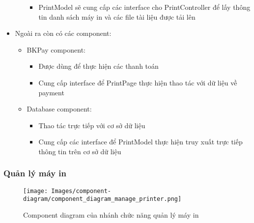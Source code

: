 \begin{itemize}
\begin{itemize}
\begin{itemize}
            \item PrintModel sẽ cung cấp các interface cho PrintController để lấy thông tin danh sách máy in và các file tài liệu được tải lên
        \end{itemize}
    \end{itemize}
    \item Ngoài ra còn có các component:
    \begin{itemize}
        \item BKPay component:
        \begin{itemize}
            \item Được dùng để thực hiện các thanh toán
            \item Cung cấp interface để PrintPage thực hiện thao tác với dữ liệu về payment
        \end{itemize}
        \item Database component:
        \begin{itemize}
            \item Thao tác trực tiếp với cơ sở dữ liệu
            \item Cung cấp các interface để PrintModel thực hiện truy xuất trực tiếp thông tin trên cơ sở dữ liệu
        \end{itemize}
    \end{itemize}
\end{itemize}

\subsubsection{Quản lý máy in}
\begin{figure}[H]
    \centering
    \texttt{[image: Images/component-diagram/component\_diagram\_manage\_printer.png]}
    \newline
    \newline
    \caption{Component diagram của nhánh chức năng quản lý máy in}
    \label{fig:enter-label}
\end{figure}

